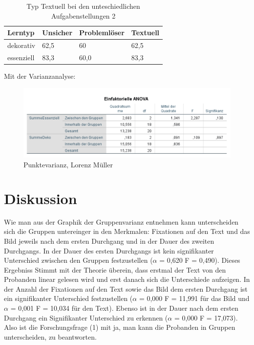 \begin{table}[!h]
\hspace{-5pt}
\begin{tabularx}{\textwidth + 5pt}{| @{\hspace{3pt}} M | @{\hspace{3pt}} M  | @{\hspace{3pt}} M | @{\hspace{3pt}} M |}
\hline
\textbf{Lerntyp} & \textbf{Unsicher} & \textbf{Problemlöser} & \textbf{Textuell}\\
\hline
\hline
    dekorativ & 62,5 & 60 &  62,5\\
\hline
    essenziell & 83,3 & 60,0 &  83,3\\
\hline
\end{tabularx}
\caption{Typ Textuell bei den unteschiedlichen Aufgabenstellungen 2}
\end{table}

Mit der Varianzanalyse: 

\begin{figure}[!ht]
\noindent\hspace{0.5mm}\includegraphics[width=15cm]{./Ressourcen/DekoEssGruppen.png}
\caption{Punktevarianz, Lorenz Müller}
\end{figure}



\chapter{Diskussion}

Wie man aus der Graphik der Gruppenvarianz entnehmen kann unterscheiden sich die Gruppen untereinger in den Merkmalen: Fixationen auf den Text und das Bild jeweils nach dem ersten Durchgang und in der Dauer des zweiten Durchgangs. In der Dauer des ersten Durchgangs ist kein signifikanter Unterschied zwischen den Gruppen festzustellen ($\alpha$ = 0,620 F = 0,490). Dieses Ergebniss Stimmt mit der Theorie überein, dass erstmal der Text von den Probanden linear gelesen wird und erst danach sich die Unterschiede aufzeigen. In der Anzahl der Fixationen auf den Text sowie das Bild dem ersten Durchgang ist ein signifikanter Unterschied festzustellen ($\alpha$ = 0,000 F = 11,991 für das Bild und $\alpha$ = 0,001 F = 10,034 für den Text). Ebenso ist in der Dauer nach dem ersten Durchgang ein Signifikanter Unterschied zu erkennen ($\alpha$ = 0,000 F = 17,073). Also ist die Forschungsfrage (1) mit ja, man kann die Probanden in Gruppen unterscheiden, zu beantworten.

